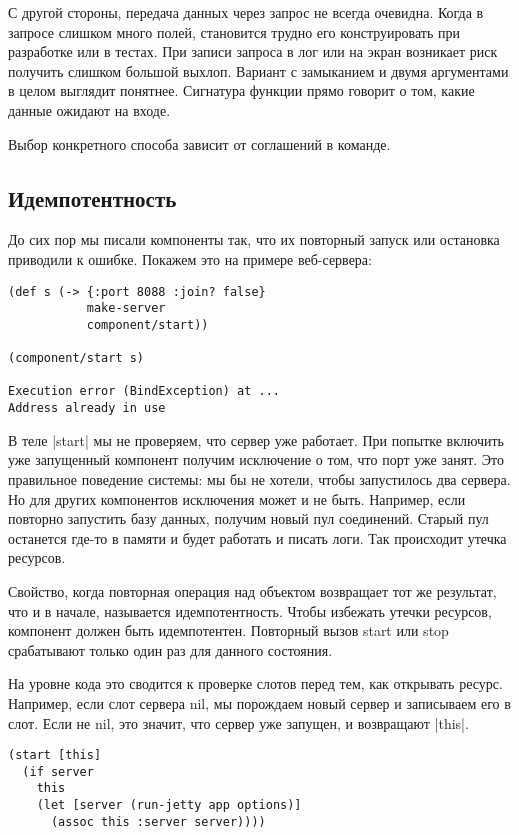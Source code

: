 С другой стороны, передача данных через запрос не всегда очевидна. Когда в
запросе слишком много полей, становится трудно его конструировать при разработке
или в тестах. При записи запроса в лог или на экран возникает риск получить
слишком большой выхлоп. Вариант с замыканием и двумя аргументами в целом
выглядит понятнее. Сигнатура функции прямо говорит о том, какие данные ожидают
на входе.

Выбор конкретного способа зависит от соглашений в команде.

\subsection{Идемпотентность}

До сих пор мы писали компоненты так, что их повторный запуск или остановка
приводили к ошибке. Покажем это на примере веб-сервера:

\begin{verbatim}
(def s (-> {:port 8088 :join? false}
           make-server
           component/start))

(component/start s)

Execution error (BindException) at ...
Address already in use
\end{verbatim}


В теле \spverb|start| мы не проверяем, что сервер уже работает. При попытке включить
уже запущенный компонент получим исключение о том, что порт уже занят. Это
правильное поведение системы: мы бы не хотели, чтобы запустилось два сервера. Но
для других компонентов исключения может и не быть. Например, если повторно
запустить базу данных, получим новый пул соединений. Старый пул останется где-то
в памяти и будет работать и писать логи. Так происходит утечка ресурсов.

Свойство, когда повторная операция над объектом возвращает тот же результат, что
и в начале, называется идемпотентность. Чтобы избежать утечки ресурсов,
компонент должен быть идемпотентен. Повторный вызов start или stop срабатывают
только один раз для данного состояния.

На уровне кода это сводится к проверке слотов перед тем, как открывать
ресурс. Например, если слот сервера nil, мы порождаем новый сервер и записываем
его в слот. Если не nil, это значит, что сервер уже запущен, и возвращают
\spverb|this|.

\begin{verbatim}
(start [this]
  (if server
    this
    (let [server (run-jetty app options)]
      (assoc this :server server))))
\end{verbatim}

